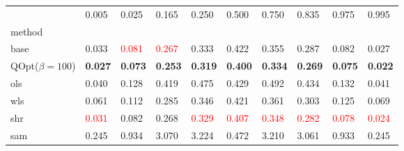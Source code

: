 \begin{tabular}{llllllllll}
\toprule
 & 0.005 & 0.025 & 0.165 & 0.250 & 0.500 & 0.750 & 0.835 & 0.975 & 0.995 \\
method &  &  &  &  &  &  &  &  &  \\
\midrule
base & 0.033 & \textcolor{red}{0.081} & \textcolor{red}{0.267} & 0.333 & 0.422 & 0.355 & 0.287 & 0.082 & 0.027 \\
\midrule
QOpt($\beta=100$) & \textbf{0.027} & \textbf{0.073} & \textbf{0.253} & \textbf{0.319} & \textbf{0.400} & \textbf{0.334} & \textbf{0.269} & \textbf{0.075} & \textbf{0.022} \\
ols & 0.040 & 0.128 & 0.419 & 0.475 & 0.429 & 0.492 & 0.434 & 0.132 & 0.041 \\
wls & 0.061 & 0.112 & 0.285 & 0.346 & 0.421 & 0.361 & 0.303 & 0.125 & 0.069 \\
shr & \textcolor{red}{0.031} & 0.082 & 0.268 & \textcolor{red}{0.329} & \textcolor{red}{0.407} & \textcolor{red}{0.348} & \textcolor{red}{0.282} & \textcolor{red}{0.078} & \textcolor{red}{0.024} \\
sam & 0.245 & 0.934 & 3.070 & 3.224 & 0.472 & 3.210 & 3.061 & 0.933 & 0.245 \\
\bottomrule
\end{tabular}